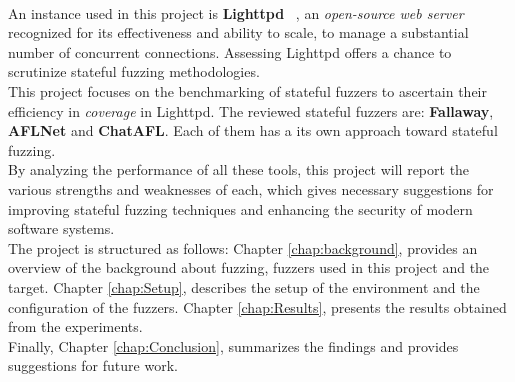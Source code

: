 \\An instance used in this project is \textbf{Lighttpd} ~\cite{lighttpd}, an \textit{open-source web server} recognized for its effectiveness and ability to scale, to manage a substantial number of concurrent connections. Assessing Lighttpd offers a chance to scrutinize stateful fuzzing methodologies.
\\This project focuses on the benchmarking of stateful fuzzers to ascertain their efficiency in \textit{coverage} in Lighttpd. The reviewed stateful fuzzers are: \textbf{Fallaway}, \textbf{AFLNet} and \textbf{ChatAFL}. Each of them has a its own approach toward stateful fuzzing.
\\By analyzing the performance of all these tools, this project will report the various strengths and weaknesses of each, which gives necessary suggestions for improving stateful fuzzing techniques and enhancing the security of modern software systems.
\\The project is structured as follows: Chapter \ref{chap:background}, provides an overview of the background about fuzzing, fuzzers used in this project and the target. Chapter \ref{chap:Setup}, describes the setup of the environment and the configuration of the fuzzers. Chapter \ref{chap:Results}, presents the results obtained from the experiments.
\\Finally, Chapter \ref{chap:Conclusion}, summarizes the findings and provides suggestions for future work.